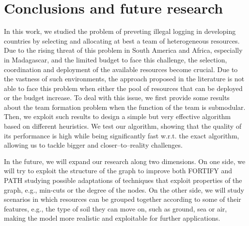 \section{Conclusions and future research}\label{sec:conclusions}
In this work, we studied the problem of preveting illegal logging in developing countries by selecting and allocating at best a team of heterogeneous resources. Due to the rising threat of this problem in South America and Africa, especially in Madagascar, and the limited budget to face this challenge, the selection, coordination and deployment of the available resources become crucial. Due to the vastness of such environments, the approach proposed in the literature is not able to face this problem when either the pool of resources that can be deployed or the budget increase. To deal with this issue, we first provide some results about the team formation problem when the function of the team is submodular. Then, we exploit such results to design a simple but very effective algorithm based on different heuristics. We test our algorithm, showing that the quality of its performance is high while being significantly fast w.r.t. the exact algorithm, allowing us to tackle bigger and closer--to--reality challenges.

In the future, we will expand our research along two dimensions. On one side, we will try to exploit the structure of the graph to improve both FORTIFY and PATH studying possible adaptations of techniques that exploit properties of the graph, e.g., min-cuts or the degree of the nodes. On the other side, we will study scenarios in which resources can be grouped together according to some of their features, e.g., the type of soil they can move on, such as ground, sea or air, making the model more realistic and exploitable for further applications.



